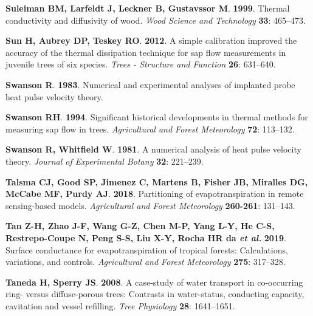 \documentclass[11pt,twoside]{reedthesis}
\begin{document}
\hypertarget{ref-Suleiman1999}{}
\textbf{\textnormal{Suleiman BM}, \textnormal{Larfeldt J},
\textnormal{Leckner B}, \textnormal{Gustavssor M}}. \textbf{1999}.
Thermal conductivity and diffusivity of wood. \emph{Wood Science and
Technology} \textbf{33}: 465--473.

\hypertarget{ref-Sun2012}{}
\textbf{\textnormal{Sun H}, \textnormal{Aubrey DP}, \textnormal{Teskey
RO}}. \textbf{2012}. A simple calibration improved the accuracy of the
thermal dissipation technique for sap flow measurements in juvenile
trees of six species. \emph{Trees - Structure and Function} \textbf{26}:
631--640.

\hypertarget{ref-Swanson1983}{}
\textbf{\textnormal{Swanson R}}. \textbf{1983}. Numerical and
experimental analyses of implanted probe heat pulse velocity theory.

\hypertarget{ref-Swanson1994}{}
\textbf{\textnormal{Swanson RH}}. \textbf{1994}. Significant historical
developments in thermal methods for measuring sap flow in trees.
\emph{Agricultural and Forest Meteorology} \textbf{72}: 113--132.

\hypertarget{ref-Swanson1981}{}
\textbf{\textnormal{Swanson R}, \textnormal{Whitfield W}}.
\textbf{1981}. A numerical analysis of heat pulse velocity theory.
\emph{Journal of Experimental Botany} \textbf{32}: 221--239.

\hypertarget{ref-Talsma2018}{}
\textbf{\textnormal{Talsma CJ}, \textnormal{Good SP},
\textnormal{Jimenez C}, \textnormal{Martens B}, \textnormal{Fisher JB},
\textnormal{Miralles DG}, \textnormal{McCabe MF}, \textnormal{Purdy
AJ}}. \textbf{2018}. Partitioning of evapotranspiration in remote
sensing-based models. \emph{Agricultural and Forest Meteorology}
\textbf{260-261}: 131--143.

\hypertarget{ref-tan_surface_2019}{}
\textbf{\textnormal{Tan Z-H}, \textnormal{Zhao J-F}, \textnormal{Wang
G-Z}, \textnormal{Chen M-P}, \textnormal{Yang L-Y}, \textnormal{He C-S},
\textnormal{Restrepo-Coupe N}, \textnormal{Peng S-S}, \textnormal{Liu
X-Y}, \textnormal{Rocha HR da} \emph{et al.}} \textbf{2019}. Surface
conductance for evapotranspiration of tropical forests: Calculations,
variations, and controls. \emph{Agricultural and Forest Meteorology}
\textbf{275}: 317--328.

\hypertarget{ref-Taneda2008}{}
\textbf{\textnormal{Taneda H}, \textnormal{Sperry JS}}. \textbf{2008}. A
case-study of water transport in co-occurring ring- versus
diffuse-porous trees: Contrasts in water-status, conducting capacity,
cavitation and vessel refilling. \emph{Tree Physiology} \textbf{28}:
1641--1651.
\end{document}
